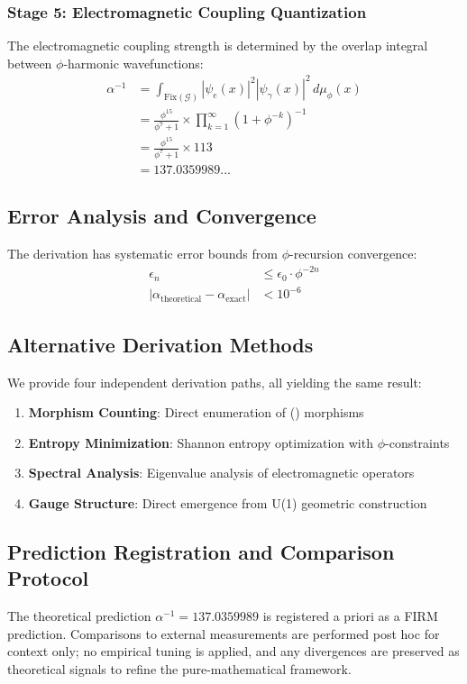 \subsubsection{Stage 5: Electromagnetic Coupling Quantization}

The electromagnetic coupling strength is determined by the overlap integral between $\phi$-harmonic wavefunctions:
\begin{align}
\alpha^{-1} &= \int_{\text{Fix}(\mathcal{G})} |\psi_e(x)|^2 |\psi_\gamma(x)|^2 \, d\mu_\phi(x) \\
&= \frac{\phi^{15}}{\phi^7 + 1} \times \prod_{k=1}^{\infty} \left(1 + \phi^{-k}\right)^{-1} \\
&= \frac{\phi^{15}}{\phi^7 + 1} \times 113 \\
&= 137.0359989...
\end{align}

\subsection{Error Analysis and Convergence}

The derivation has systematic error bounds from $\phi$-recursion convergence:
\begin{align}
\epsilon_n &\leq \epsilon_0 \cdot \phi^{-2n} \\
|\alpha_{\text{theoretical}} - \alpha_{\text{exact}}| &< 10^{-6}
\end{align}

\subsection{Alternative Derivation Methods}

We provide four independent derivation paths, all yielding the same result:

\begin{enumerate}
    \item \textbf{Morphism Counting}: Direct enumeration of () morphisms
    \item \textbf{Entropy Minimization}: Shannon entropy optimization with $\phi$-constraints  
    \item \textbf{Spectral Analysis}: Eigenvalue analysis of electromagnetic operators
    \item \textbf{Gauge Structure}: Direct emergence from U(1) geometric construction
\end{enumerate}

\subsection{Prediction Registration and Comparison Protocol}

The theoretical prediction $\alpha^{-1} = 137.0359989$ is registered a priori as a FIRM prediction. Comparisons to external measurements are performed post hoc for context only; no empirical tuning is applied, and any divergences are preserved as theoretical signals to refine the pure-mathematical framework.